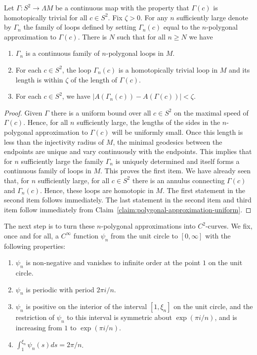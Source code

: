 \begin{corollary}
\label{cor:polygonal-approximation-of-family}
\label{Gammaapprox}
Let $\Gamma\colon S^2\to \Lambda M$ be a continuous map  with the
property that $\Gamma(c)$ is homotopically trivial for all $c\in
S^2$. Fix $\zeta>0$. For any $n$ sufficiently large denote by
$\Gamma_n$ the family of loops defined by setting $\Gamma_n(c)$
equal to the  $n$-polygonal approximation to $\Gamma(c)$. There is
$N$ such that for all $n\ge N$ we have
\begin{enumerate}
\item[(1)] $\Gamma_n$ is a continuous family of $n$-polygonal loops in
$M$.
\item[(2)] For each $c\in S^2$, the loop
$\Gamma_n(c)$ is a homotopically trivial loop in $M$ and its length
is within $\zeta$ of the length of $\Gamma(c)$.
\item[(3)] For each $c\in S^2$, we have $|A(\Gamma_n(c))-A(\Gamma(c))|<\zeta$.
\end{enumerate}
\end{corollary}

\begin{proof}
Given $\Gamma$ there is a uniform bound over all $c\in S^2$ on the
maximal speed of $\Gamma(c)$. Hence, for all $n$ sufficiently large,
the lengths of the sides in the $n$-polygonal approximation to
$\Gamma(c)$ will be uniformly small. Once this length is less than
the injectivity radius of $M$, the minimal geodesics between the
endpoints are unique and vary continuously with the endpoints. This
implies that for $n$ sufficiently large the family $\Gamma_n$ is
uniquely determined and itself forms a continuous family of loops in
$M$. This proves the first item. We have already seen that, for $n$
sufficiently large, for all $c\in S^2$ there is an annulus
connecting $\Gamma(c)$ and $\Gamma_n(c)$. Hence, these loops are
homotopic in $M$. The first statement in the second item follows
immediately. The last statement in the second item and third item
follow immediately from Claim~\ref{claim:polygonal-approximation-uniform}.
\end{proof}

The next step is  to turn these $n$-polygonal approximations into
$C^2$-curves. We fix, once and for all, a $C^\infty$ function
$\psi_n$ from the unit circle to $[0,\infty]$ with the following
properties:
\begin{enumerate}
\item[(1)] $\psi_n$ is non-negative and vanishes to infinite order at the point $1$ on the unit circle.
\item[(2)] $\psi_n$ is periodic with period $2\pi i/n$.
 \item[(3)] $\psi_n$ is positive on the interior of the interval $[1,\xi_n]$ on the unit circle,
and the restriction of $\psi_n$ to this interval is symmetric about
$\exp(\pi i/n)$, and is increasing from $1$ to $\exp(\pi
i/n)$.
\item[(4)] $\int_1^{\xi_n}\psi_n(s)ds =2\pi/n$.
\end{enumerate}

